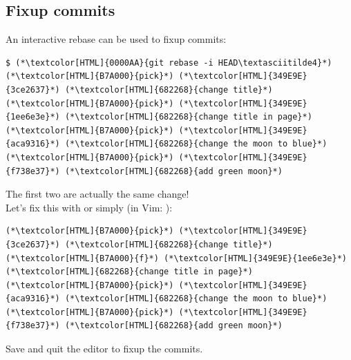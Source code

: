 \subsection{Fixup commits}
\begin{frame}[fragile]
  \subslidetitle
  An interactive rebase can be used to fixup commits:
  \begin{lstlisting}
$ (*\textcolor[HTML]{0000AA}{git rebase -i HEAD\textasciitilde4}*)
(*\textcolor[HTML]{B7A000}{pick}*) (*\textcolor[HTML]{349E9E}{3ce2637}*) (*\textcolor[HTML]{682268}{change title}*)
(*\textcolor[HTML]{B7A000}{pick}*) (*\textcolor[HTML]{349E9E}{1ee6e3e}*) (*\textcolor[HTML]{682268}{change title in page}*)
(*\textcolor[HTML]{B7A000}{pick}*) (*\textcolor[HTML]{349E9E}{aca9316}*) (*\textcolor[HTML]{682268}{change the moon to blue}*)
(*\textcolor[HTML]{B7A000}{pick}*) (*\textcolor[HTML]{349E9E}{f738e37}*) (*\textcolor[HTML]{682268}{add green moon}*)
\end{lstlisting}
  The first two are actually the same change!\\

  \vspace{1em}
  Let's fix this with  or simply  (in Vim: ):
  \begin{lstlisting}
(*\textcolor[HTML]{B7A000}{pick}*) (*\textcolor[HTML]{349E9E}{3ce2637}*) (*\textcolor[HTML]{682268}{change title}*)
(*\textcolor[HTML]{B7A000}{f}*) (*\textcolor[HTML]{349E9E}{1ee6e3e}*) (*\textcolor[HTML]{682268}{change title in page}*)
(*\textcolor[HTML]{B7A000}{pick}*) (*\textcolor[HTML]{349E9E}{aca9316}*) (*\textcolor[HTML]{682268}{change the moon to blue}*)
(*\textcolor[HTML]{B7A000}{pick}*) (*\textcolor[HTML]{349E9E}{f738e37}*) (*\textcolor[HTML]{682268}{add green moon}*)
\end{lstlisting}
  Save and quit the editor to fixup the commits.
\end{frame}

